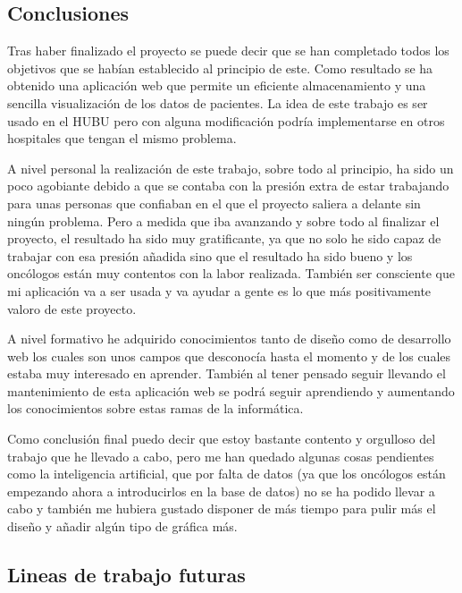 
\subsection{Conclusiones}

Tras haber finalizado el proyecto se puede decir que se han completado todos los objetivos que se habían establecido al principio de este. Como resultado se ha obtenido una aplicación web que permite un eficiente almacenamiento y una sencilla visualización de los datos de pacientes. La idea de este trabajo es ser usado en el HUBU pero con alguna modificación podría implementarse en otros hospitales que tengan el mismo problema.

A nivel personal la realización de este trabajo, sobre todo al principio, ha sido un poco agobiante debido a que se contaba con la presión extra de estar trabajando para unas personas que confiaban en el que el proyecto saliera a delante sin ningún problema. Pero a medida que iba avanzando y sobre todo al finalizar el proyecto, el resultado ha sido muy gratificante, ya que no solo he sido capaz de trabajar con esa presión añadida sino que el resultado ha sido bueno y los oncólogos están muy contentos con la labor realizada. También ser consciente que mi aplicación va a ser usada y va ayudar a gente es lo que más positivamente valoro de este proyecto.

A nivel formativo he adquirido conocimientos tanto de diseño como de desarrollo web los cuales son unos campos que desconocía hasta el momento y de los cuales estaba muy interesado en aprender. También al tener pensado seguir llevando el mantenimiento de esta aplicación web se podrá seguir aprendiendo y aumentando los conocimientos sobre estas ramas de la informática.

Como conclusión final puedo decir que estoy bastante contento y orgulloso del trabajo que he llevado a cabo, pero me han quedado algunas cosas pendientes como la inteligencia artificial, que por falta de datos (ya que los oncólogos están empezando ahora a introducirlos en la base de datos) no se ha podido llevar a cabo y también me hubiera gustado disponer de más tiempo para pulir más el diseño y añadir algún tipo de gráfica más. 

\subsection{Lineas de trabajo futuras}

